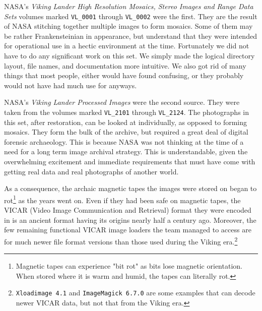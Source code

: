 NASA's {\it Viking Lander High Resolution Mosaics, Stereo Images and Range Data Sets} volumes marked {\tt VL_0001} through {\tt VL_0002} were the first. They are the result of NASA stitching together multiple images to form mosaics. Some of them may be rather Frankensteinian in appearance, but understand that they were intended for operational use in a hectic environment at the time. Fortunately we did not have to do any significant work on this set. We simply made the logical directory layout, file names, and documentation more intuitive. We also got rid of many things that most people, either would have found confusing, or they probably would not have had much use for anyways.

NASA's {\it Viking Lander Processed Images} were the second source. They were taken from the volumes marked {\tt VL_2101} through {\tt VL_2124}. The photographs in this set, after restoration, can be looked at individually, as opposed to forming mosaics. They form the bulk of the archive, but required a great deal of digital forensic archaeology. This is because NASA was not thinking at the time of a need for a long term image archival strategy. This is understandable, given the overwhelming excitement and immediate requirements that must have come with getting real data and real photographs of another world.

    {}

As a consequence, the archaic magnetic tapes the images were stored on began to rot\footnote{Magnetic tapes can experience "bit rot" as bits lose magnetic orientation. When stored where it is warm and humid, the tapes can literally rot.} as the years went on. Even if they had been safe on magnetic tapes, the VICAR (Video Image Communication and Retrieval) format they were encoded in is an ancient format having its origins nearly half a century ago. Moreover, the few remaining functional VICAR image loaders the team managed to access are for much newer file format versions than those used during the Viking era.\footnote{{\tt Xloadimage 4.1} and {\tt ImageMagick 6.7.0} are some examples that can decode newer VICAR data, but not that from the Viking era.}

